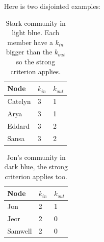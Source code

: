 \documentclass[10pt,a4paper]{article}
\begin{document}
\begin{enumerate}
Here is two disjointed examples: 

\begin{table}[H]
	\centering
	\caption{Stark community in \textcolor{spirodiscoball}{light blue}. Each member have a $k_{in}$ bigger than the $k_{out}$ so the strong criterion applies. }
	\label{my-asdf}
	\begin{tabular}{|l|l|l|}
		\hline
		\textbf{Node}    & $k_{in}$ & $k_{out}$ \\ \hline
		Catelyn & 3        & 1         \\ \hline
		Arya    & 3        & 1         \\ \hline
		Eddard  & 3        & 2         \\ \hline
		Sansa   & 3        & 2         \\ \hline
	\end{tabular}
\end{table}

\begin{table}[H]
	\centering
	\caption{Jon's community in \textcolor{smalt}{dark blue}, the strong criterion applies too. }
	\label{my-label}
	\begin{tabular}{|l|l|l|}
		\hline
		Node    & $k_{in}$ & $k_{out}$ \\ \hline
		Jon     & 2        & 1         \\ \hline
		Jeor    & 2        & 0         \\ \hline
		Samwell & 2        & 0         \\ \hline
	\end{tabular}
\end{table}


\end{enumerate}
\end{document}
